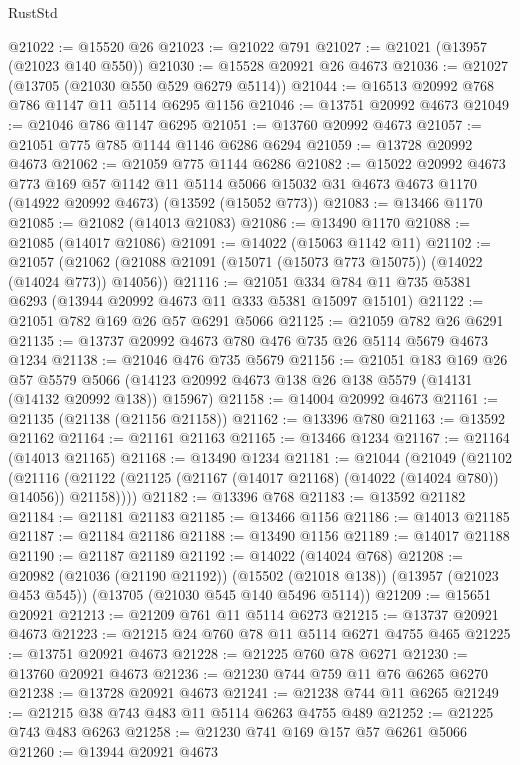 \begin{lexlean}{RustStd}
\begin{coremodule}
@21022 := @15520 @26
@21023 := @21022 @791
@21027 := @21021 (@13957 (@21023 @140 @550))
@21030 := @15528 @20921 @26 @4673
@21036 := @21027 (@13705 (@21030 @550 @529 @6279 @5114))
@21044 := @16513 @20992 @768 @786 @1147 @11 @5114 @6295 @1156
@21046 := @13751 @20992 @4673
@21049 := @21046 @786 @1147 @6295
@21051 := @13760 @20992 @4673
@21057 := @21051 @775 @785 @1144 @1146 @6286 @6294
@21059 := @13728 @20992 @4673
@21062 := @21059 @775 @1144 @6286
@21082 := @15022
    @20992
    @4673
    @773
    @169
    @57
    @1142
    @11
    @5114
    @5066
    @15032
    @31
    @4673
    @4673
    @1170
    (@14922 @20992 @4673)
    (@13592 (@15052 @773))
@21083 := @13466 @1170
@21085 := @21082 (@14013 @21083)
@21086 := @13490 @1170
@21088 := @21085 (@14017 @21086)
@21091 := @14022 (@15063 @1142 @11)
@21102 := @21057
    (@21062 (@21088 @21091 (@15071 (@15073 @773 @15075)) (@14022 (@14024 @773)) @14056))
@21116 := @21051 @334 @784 @11 @735 @5381 @6293 (@13944 @20992 @4673 @11 @333 @5381 @15097 @15101)
@21122 := @21051 @782 @169 @26 @57 @6291 @5066
@21125 := @21059 @782 @26 @6291
@21135 := @13737 @20992 @4673 @780 @476 @735 @26 @5114 @5679 @4673 @1234
@21138 := @21046 @476 @735 @5679
@21156 := @21051
    @183
    @169
    @26
    @57
    @5579
    @5066
    (@14123 @20992 @4673 @138 @26 @138 @5579 (@14131 (@14132 @20992 @138)) @15967)
@21158 := @14004 @20992 @4673
@21161 := @21135 (@21138 (@21156 @21158))
@21162 := @13396 @780
@21163 := @13592 @21162
@21164 := @21161 @21163
@21165 := @13466 @1234
@21167 := @21164 (@14013 @21165)
@21168 := @13490 @1234
@21181 := @21044
    (@21049
      (@21102
        (@21116 (@21122 (@21125 (@21167 (@14017 @21168) (@14022 (@14024 @780)) @14056)) @21158))))
@21182 := @13396 @768
@21183 := @13592 @21182
@21184 := @21181 @21183
@21185 := @13466 @1156
@21186 := @14013 @21185
@21187 := @21184 @21186
@21188 := @13490 @1156
@21189 := @14017 @21188
@21190 := @21187 @21189
@21192 := @14022 (@14024 @768)
@21208 := @20982
    (@21036 (@21190 @21192))
    (@15502 (@21018 @138))
    (@13957 (@21023 @453 @545))
    (@13705 (@21030 @545 @140 @5496 @5114))
@21209 := @15651 @20921
@21213 := @21209 @761 @11 @5114 @6273
@21215 := @13737 @20921 @4673
@21223 := @21215 @24 @760 @78 @11 @5114 @6271 @4755 @465
@21225 := @13751 @20921 @4673
@21228 := @21225 @760 @78 @6271
@21230 := @13760 @20921 @4673
@21236 := @21230 @744 @759 @11 @76 @6265 @6270
@21238 := @13728 @20921 @4673
@21241 := @21238 @744 @11 @6265
@21249 := @21215 @38 @743 @483 @11 @5114 @6263 @4755 @489
@21252 := @21225 @743 @483 @6263
@21258 := @21230 @741 @169 @157 @57 @6261 @5066
@21260 := @13944 @20921 @4673

\end{coremodule}
\end{lexlean}
